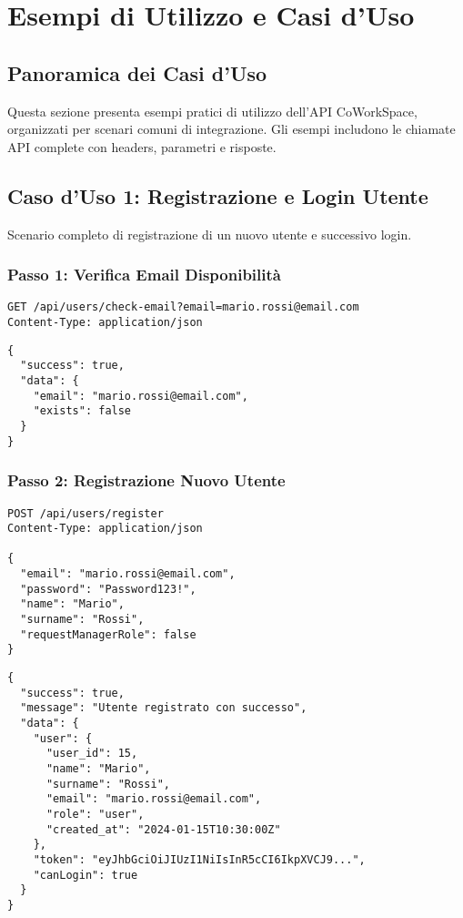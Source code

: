 \section{Esempi di Utilizzo e Casi d'Uso}

\subsection{Panoramica dei Casi d'Uso}
Questa sezione presenta esempi pratici di utilizzo dell'API CoWorkSpace, organizzati per scenari comuni di integrazione. Gli esempi includono le chiamate API complete con headers, parametri e risposte.

\subsection{Caso d'Uso 1: Registrazione e Login Utente}
Scenario completo di registrazione di un nuovo utente e successivo login.

\subsubsection{Passo 1: Verifica Email Disponibilità}
\begin{lstlisting}[style=httpstyle, caption=Verifica Email Esistente]
GET /api/users/check-email?email=mario.rossi@email.com
Content-Type: application/json
\end{lstlisting}

\begin{lstlisting}[caption=Risposta Email Non Esistente]
{
  "success": true,
  "data": {
    "email": "mario.rossi@email.com",
    "exists": false
  }
}
\end{lstlisting}

\subsubsection{Passo 2: Registrazione Nuovo Utente}
\begin{lstlisting}[style=httpstyle, caption=Registrazione Utente]
POST /api/users/register
Content-Type: application/json

{
  "email": "mario.rossi@email.com",
  "password": "Password123!",
  "name": "Mario",
  "surname": "Rossi",
  "requestManagerRole": false
}
\end{lstlisting}

\newpage

\begin{lstlisting}[caption=Risposta Registrazione Riuscita]
{
  "success": true,
  "message": "Utente registrato con successo",
  "data": {
    "user": {
      "user_id": 15,
      "name": "Mario",
      "surname": "Rossi",
      "email": "mario.rossi@email.com",
      "role": "user",
      "created_at": "2024-01-15T10:30:00Z"
    },
    "token": "eyJhbGciOiJIUzI1NiIsInR5cCI6IkpXVCJ9...",
    "canLogin": true
  }
}
\end{lstlisting}

